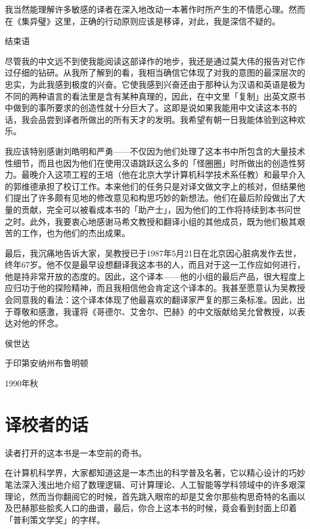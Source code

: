 \documentclass[
  12pt,
  twoside,
  openright,
  oldfontcommands,
]{memoir}
\begin{document}
我当然能理解许多敏感的译者在深入地改动一本著作时所产生的不情愿心理。然而在《集异璧》这里，正确的行动原则应该是移译，对此，我是深信不疑的。

{结束语}

尽管我的中文远不到使我能阅读这部译作的地步，我还是通过莫大伟的报告对它作过仔细的钻研。从我所了解到的看，我相当确信它体现了对我的意图的最深层次的忠实，为此我感到极度的兴奋。它使我感到兴奋还由于那种认为汉语和英语是极为不同的两种语言的看法里是含有某种真理的，因此，在中文里「复制」出英文原书中做到的事所要求的创造性就十分巨大了。这即是说如果我能用中文读这本书的话，我会品尝到译者所做出的所有天才的发明。我希望有朝一日我能体验到这种欢乐。

我应该特别感谢刘皓明和严勇------不仅因为他们处理了这本书中所包含的大量技术性细节，而且也因为他们在使用汉语跳跃这么多的「怪圈圈」时所做出的创造性努力。最晚介入这项工程的王培（他在北京大学计算机科学技术系任教）和最早介入的郭维德承担了校订工作。本来他们的任务只是对译文做文字上的核对，但结果他们提出了许多颇有见地的修改意见和构思巧妙的新想法。他们在最后阶段做出了大量的贡献，完全可以被看成本书的「助产士」，因为他们的工作将持续到本书问世之时。此外，我要衷心地感谢马希文教授和翻译小组的其他成员，既为他们极其艰苦的工作，也为他们的杰出成果。

最后，我沉痛地告诉大家，吴教授已于1987年5月21日在北京因心脏病发作去世，终年67岁。他不仅是最早设想翻译我这本书的人，而且对于这一工作应如何进行，他是持非常开放的态度的。因此，这个译本------他的小组的最后产品，很大程度上应归功于他的探险精神，而且我相信他会肯定这个译本的。我甚至愿意认为吴教授会同意我的看法：这个译本体现了他最喜欢的翻译家严复的那三条标准。因此，出于尊敬和感激，我谨将《哥德尔、艾舍尔、巴赫》的中文版献给吴允曾教授，以表达对他的怀念。

侯世达

于印第安纳州布鲁明顿

1990年秋

\label{Preface2.xhtml}{}

\chapter*{译校者的话}

读者打开的这本书是一本空前的奇书。

在计算机科学界，大家都知道这是一本杰出的科学普及名著，它以精心设计的巧妙笔法深入浅出地介绍了数理逻辑、可计算理论、人工智能等学科领域中的许多艰深理论，然而当你翻阅它的时候，首先跳入眼帘的却是艾舍尔那些构思奇特的名画以及巴赫那些脍炙人口的曲谱，最后，你合上这本书的时候，竟会看到封面上印着「普利策文学奖」的字样。
\end{document}
